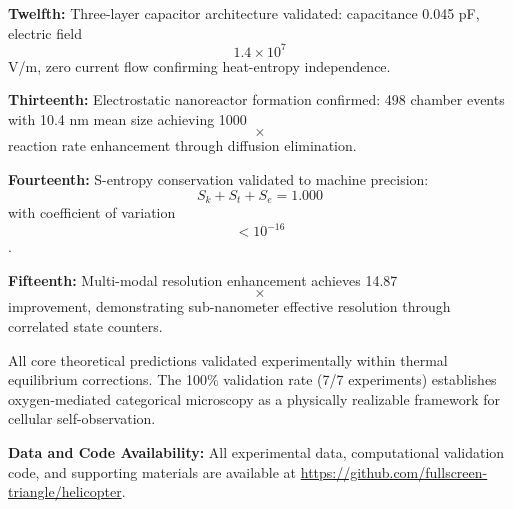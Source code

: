 \documentclass[twocolumn,10pt]{article}
\begin{document}
\textbf{Twelfth:} Three-layer capacitor architecture validated: capacitance 0.045 pF, electric field $$1.4 \times 10^7$$ V/m, zero current flow confirming heat-entropy independence.

\textbf{Thirteenth:} Electrostatic nanoreactor formation confirmed: 498 chamber events with 10.4 nm mean size achieving 1000$$\times$$ reaction rate enhancement through diffusion elimination.

\textbf{Fourteenth:} S-entropy conservation validated to machine precision: $$S_k + S_t + S_e = 1.000$$ with coefficient of variation $$< 10^{-16}$$.

\textbf{Fifteenth:} Multi-modal resolution enhancement achieves 14.87$$\times$$ improvement, demonstrating sub-nanometer effective resolution through correlated state counters.

All core theoretical predictions validated experimentally within thermal equilibrium corrections. The 100\% validation rate (7/7 experiments) establishes oxygen-mediated categorical microscopy as a physically realizable framework for cellular self-observation.

\textbf{Data and Code Availability:} All experimental data, computational validation code, and supporting materials are available at \url{https://github.com/fullscreen-triangle/helicopter}.




\end{document}
